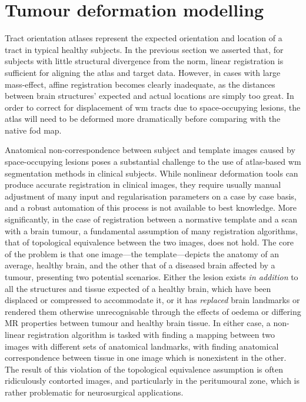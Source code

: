 \section{Tumour deformation modelling}
\label{chapterlabel3}

Tract orientation atlases represent the expected orientation and location of a tract in typical healthy subjects.
In the previous section we asserted that, for subjects with little structural divergence from the norm, linear registration is sufficient for aligning the atlas and target data.
However, in cases with large mass-effect, affine registration becomes clearly inadequate, as the distances between brain structures' expected and actual locations are simply too great.
In order to correct for displacement of \gls{wm} tracts due to space-occupying lesions, the atlas will need to be deformed more dramatically before comparing with the native \gls{fod} map.

Anatomical non-correspondence between subject and template images caused by space-occupying lesions poses a substantial challenge to the use of atlas-based \gls{wm} segmentation methods in clinical subjects.
While nonlinear deformation tools can produce accurate registration in clinical images, they require usually manual adjustment of many input and regularisation parameters on a case by case basis, and a robust automation of this process is not available to best knowledge.
More significantly, in the case of registration between a normative template and a scan with a brain tumour, a fundamental assumption of many registration algorithms, that of topological equivalence between the two images, does not hold\autocite{Zacharaki2009}.
The core of the problem is that one image---the template---depicts the anatomy of an average, healthy brain, and the other that of a diseased brain affected by a tumour, presenting two potential scenarios.
Either the lesion exists \textit{in addition} to all the structures and tissue expected of a healthy brain, which have been displaced or compressed to accommodate it, or it has \textit{replaced} brain landmarks or rendered them otherwise unrecognisable through the effects of oedema or differing MR properties between tumour and healthy brain tissue.
In either case, a non-linear registration algorithm is tasked with finding a mapping between two images with different sets of anatomical landmarks, with finding anatomical correspondence between tissue in one image which is nonexistent in the other.
The result of this violation of the topological equivalence assumption is often ridiculously contorted images, and particularly in the peritumoural zone, which is rather problematic for neurosurgical applications.

